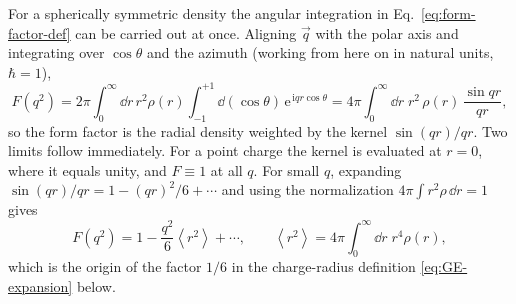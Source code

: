 For a spherically symmetric density the angular integration in
Eq.~\eqref{eq:form-factor-def} can be carried out at once. Aligning $\vec q$ with the
polar axis and integrating over $\cos\theta$ and the azimuth (working from here on in
natural units, $\hbar = 1$),
\begin{equation}
    F(q^{2}) = 2\pi\!\int_{0}^{\infty}\!\!\dd r\, r^{2}\rho(r)
               \int_{-1}^{+1}\!\!\dd(\cos\theta)\,\mathrm{e}^{\,\mathrm{i}qr\cos\theta}
             = 4\pi\!\int_{0}^{\infty}\!\dd r\; r^{2}\,\rho(r)\,\frac{\sin qr}{qr},
    \label{eq:form-factor-radial}
\end{equation}
so the form factor is the radial density weighted by the kernel $\sin(qr)/qr$. Two limits
follow immediately. For a point charge the kernel is evaluated at $r=0$, where it equals
unity, and $F \equiv 1$ at all $q$. For small $q$, expanding
$\sin(qr)/qr = 1 - (qr)^{2}/6 + \cdots$ and using the normalization
$4\pi\int r^{2}\rho\,\dd r = 1$ gives
\begin{equation}
    F(q^{2}) = 1 - \frac{q^{2}}{6}\left\langle r^{2}\right\rangle + \cdots,
    \qquad
    \left\langle r^{2}\right\rangle = 4\pi\!\int_{0}^{\infty}\!\dd r\; r^{4}\rho(r),
    \label{eq:form-factor-expansion}
\end{equation}
which is the origin of the factor $1/6$ in the charge-radius definition
\eqref{eq:GE-expansion} below.


